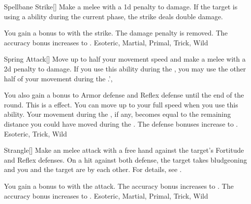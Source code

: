 \lowercase{\hypertarget{maneuver:Spellbane Strike}{}}\label{maneuver:Spellbane Strike}
\hypertarget{maneuver:Spellbane Strike}{}
\begin{freeability}[Rank 1]{Spellbane Strike}[]
Make a melee  with a \minus1d penalty to damage.
If the target is using a  ability during the current phase, the strike deals double damage.

\rankline
{} You gain a  bonus to  with the strike.
 The damage penalty is removed.
 The accuracy bonus increases to .
 Esoteric, Martial, Primal, Trick, Wild
\end{freeability}
\vspace{0.25em}



\lowercase{\hypertarget{maneuver:Spring Attack}{}}\label{maneuver:Spring Attack}
\hypertarget{maneuver:Spring Attack}{}
\begin{freeability}[Rank 1]{Spring Attack}[]
Move up to half your movement speed and make a melee  with a \minus2d penalty to damage.
If you use this ability during the , you may use the other half of your movement during the .',

\rankline
{} You also gain a  bonus to Armor defense and Reflex defense until the end of the round. This is a  effect.
 You can move up to your full speed when you use this ability.
Your movement during the , if any, becomes equal to the remaining distance you could have moved during the .
 The defense bonuses increase to .
 Esoteric, Trick, Wild
\end{freeability}
\vspace{0.25em}



\lowercase{\hypertarget{maneuver:Strangle}{}}\label{maneuver:Strangle}
\hypertarget{maneuver:Strangle}{}
\begin{freeability}[Rank 1]{Strangle}[]
Make an melee attack with a free hand against the target's Fortitude and Reflex defenses.
On a hit against both defense, the target takes bludgeoning  and you and the target are  by each other.
For details, see .

\rankline
{} You gain a  bonus to  with the attack.
 The accuracy bonus increases to .
 The accuracy bonus increases to .
 Esoteric, Martial, Primal, Trick, Wild
\end{freeability}
\vspace{0.25em}



